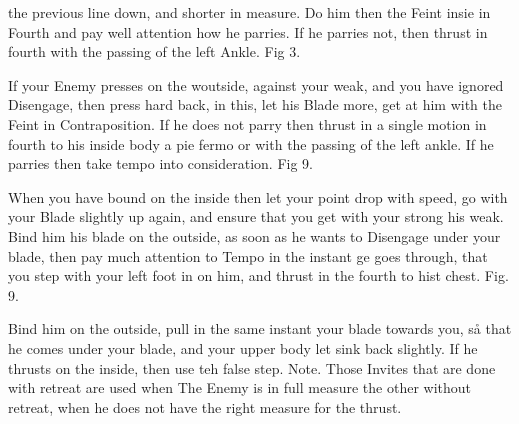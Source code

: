 \newpage


\newpage

the previous line down, and shorter in measure. Do him then the Feint insie in Fourth and pay well attention how he parries. If he parries not, then thrust in fourth with the passing of the left Ankle. Fig 3.

\exercise{}
If your Enemy presses on the woutside, against your weak, and you have ignored Disengage, then press hard back, in this, let his Blade more, get at him with the Feint in Contraposition. If he does not parry then thrust in a single motion in fourth to his inside body a pie fermo or with the passing of the left ankle. If he parries then take tempo into consideration. Fig 9.

When you have bound on the inside then let your point drop with speed,
go with your Blade slightly up again, and ensure that you get with
your strong his weak. Bind him his blade on the outside, as soon as he
wants to Disengage under your blade, then pay much attention to Tempo
in the instant ge goes through, that you step with your left foot in
on him, and thrust in the fourth to hist chest. Fig. 9.


Bind him on the outside, pull in the same instant your blade towards
you, så that he comes under your blade, and your upper body let sink
back slightly. If he thrusts on the inside, then use teh false
step. Note. Those Invites that are done with retreat are used when The
Enemy is in full measure the other without retreat, when he does not
have the right measure for the thrust.


